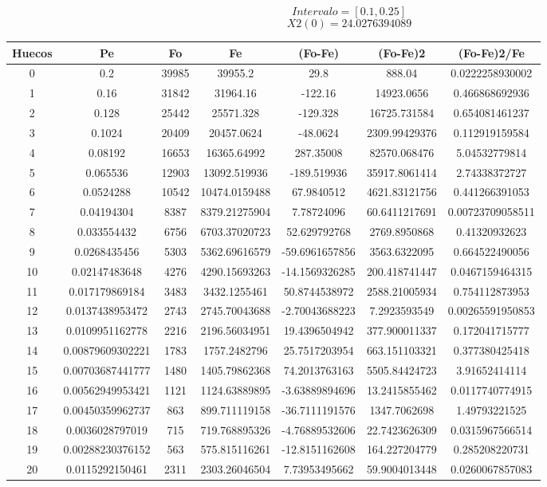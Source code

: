 \documentclass{article}
\begin{document}
$$
Intervalo = [0.1, 0.25]
$$
$$
X2(0) = 24.0276394089
$$
\begin{tabular}{|c|c|c|c|c|c|c|}
Huecos&Pe&Fo&Fe&(Fo{-}Fe)&(Fo{-}Fe)2&(Fo{-}Fe)2/Fe\\
\hline
0&0.2&39985&39955.2&29.8&888.04&0.0222258930002\\
\hline
1&0.16&31842&31964.16&{-}122.16&14923.0656&0.466868692936\\
\hline
2&0.128&25442&25571.328&{-}129.328&16725.731584&0.654081461237\\
\hline
3&0.1024&20409&20457.0624&{-}48.0624&2309.99429376&0.112919159584\\
\hline
4&0.08192&16653&16365.64992&287.35008&82570.068476&5.04532779814\\
\hline
5&0.065536&12903&13092.519936&{-}189.519936&35917.8061414&2.74338372727\\
\hline
6&0.0524288&10542&10474.0159488&67.9840512&4621.83121756&0.441266391053\\
\hline
7&0.04194304&8387&8379.21275904&7.78724096&60.6411217691&0.00723709058511\\
\hline
8&0.033554432&6756&6703.37020723&52.629792768&2769.8950868&0.41320932623\\
\hline
9&0.0268435456&5303&5362.69616579&{-}59.6961657856&3563.6322095&0.664522490056\\
\hline
10&0.02147483648&4276&4290.15693263&{-}14.1569326285&200.418741447&0.0467159464315\\
\hline
11&0.017179869184&3483&3432.1255461&50.8744538972&2588.21005934&0.754112873953\\
\hline
12&0.0137438953472&2743&2745.70043688&{-}2.70043688223&7.2923593549&0.00265591950853\\
\hline
13&0.0109951162778&2216&2196.56034951&19.4396504942&377.900011337&0.172041715777\\
\hline
14&0.00879609302221&1783&1757.2482796&25.7517203954&663.151103321&0.377380425418\\
\hline
15&0.00703687441777&1480&1405.79862368&74.2013763163&5505.84424723&3.91652414114\\
\hline
16&0.00562949953421&1121&1124.63889895&{-}3.63889894696&13.2415855462&0.0117740774915\\
\hline
17&0.00450359962737&863&899.711119158&{-}36.7111191576&1347.7062698&1.49793221525\\
\hline
18&0.0036028797019&715&719.768895326&{-}4.76889532606&22.7423626309&0.0315967566514\\
\hline
19&0.00288230376152&563&575.815116261&{-}12.8151162608&164.227204779&0.285208220731\\
\hline
20&0.0115292150461&2311&2303.26046504&7.73953495662&59.9004013448&0.0260067857083\\
\end{tabular}
\end{document}
